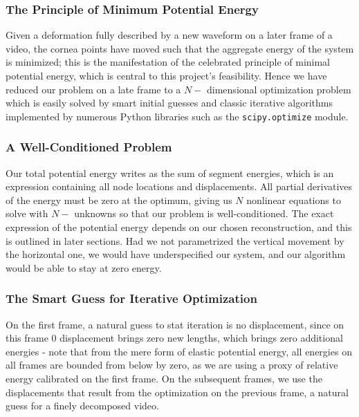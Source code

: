 \documentclass[epjST]{svjour}
\begin{document}
\subsubsection{The Principle of Minimum Potential Energy}
Given a deformation fully described by a new waveform on a later frame of a video, the cornea points have moved such that the aggregate energy of the system is minimized; this is the manifestation of the celebrated principle of minimal potential energy, which is central to this project's feasibility. Hence we have reduced our problem on a late frame to a $N-$ dimensional optimization problem which is easily solved by smart initial guesses and classic iterative algorithms implemented by numerous Python libraries such as the \texttt{scipy.optimize} module.
\subsubsection{A Well-Conditioned Problem}
Our total potential energy writes as the sum of segment energies, which is an expression containing all node locations and displacements. All partial derivatives of the energy must be zero at the optimum, giving us $N$ nonlinear equations to solve with $N-$ unknowns so that our problem is well-conditioned. The exact expression of the potential energy depends on our chosen reconstruction, and this is outlined in later sections. Had we not parametrized the vertical movement by the horizontal one, we would have underspecified our system, and our algorithm would be able to stay at zero energy. 
\subsubsection{The Smart Guess for Iterative Optimization}
\label{sec:smart}
On the first frame, a natural guess to stat iteration is no displacement, since on this frame 0 displacement brings zero new lengths, which brings zero additional energies - note that from the mere form of elastic potential energy, all energies on all frames are bounded from below by zero, as we are using a proxy of relative energy calibrated on the first frame. On the subsequent frames, we use the displacements that result from the optimization on the previous frame, a natural guess for a finely decomposed video.
\end{document}
